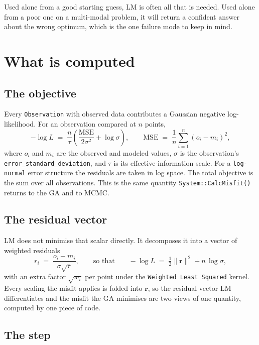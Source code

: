 \documentclass[11pt,a4paper]{article}
\newcommand{\code}[1]{\texttt{\small #1}}
\begin{document}
Used alone from a good starting guess, LM is often all that is needed. Used
alone from a poor one on a multi-modal problem, it will return a confident
answer about the wrong optimum, which is the one failure mode to keep in mind.

\section{What is computed}

\subsection{The objective}

Every \code{Observation} with observed data contributes a Gaussian negative
log-likelihood. For an observation compared at $n$ points,
\begin{equation}
  -\log L \;=\; \frac{n}{\tau}\left(\frac{\mathrm{MSE}}{2\sigma^{2}}
                                    + \log \sigma\right),
  \qquad
  \mathrm{MSE} \;=\; \frac{1}{n}\sum_{i=1}^{n}\left(o_i - m_i\right)^{2},
\end{equation}
where $o_i$ and $m_i$ are the observed and modeled values, $\sigma$ is the
observation's \code{error\_standard\_deviation}, and $\tau$ is its
effective-information scale. For a \code{log-normal} error structure the
residuals are taken in log space. The total objective is the sum over all
observations. This is the same quantity \code{System::CalcMisfit()} returns to
the GA and to MCMC.

\subsection{The residual vector}

LM does not minimise that scalar directly. It decomposes it into a vector of
weighted residuals
\begin{equation}
  r_i \;=\; \frac{o_i - m_i}{\sigma\sqrt{\tau}},
  \qquad\text{so that}\qquad
  -\log L \;=\; \tfrac{1}{2}\lVert \mathbf{r}\rVert^{2} + n\,\log\sigma ,
\end{equation}
with an extra factor $\sqrt{w_i}$ per point under the
\code{Weighted Least Squared} kernel. Every scaling the misfit applies is folded
into $\mathbf{r}$, so the residual vector LM differentiates and the misfit the
GA minimises are two views of one quantity, computed by one piece of code.

\subsection{The step}
\end{document}
